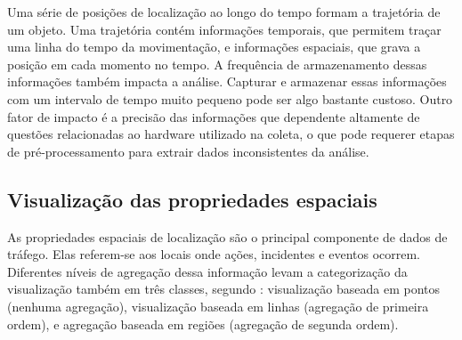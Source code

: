   Uma série de posições de localização ao longo do tempo formam a trajetória de
um objeto. Uma trajetória contém informações temporais, que permitem traçar uma
linha do tempo da movimentação, e informações espaciais, que grava a posição em
cada momento no tempo.    A frequência de armazenamento dessas informações também impacta a análise.
Capturar e armazenar essas informações com um intervalo de tempo muito pequeno
pode ser algo bastante custoso. Outro fator de impacto é a precisão das
informações que dependente altamente de questões relacionadas ao hardware
utilizado na coleta, o que pode requerer etapas de pré-processamento para
extrair dados inconsistentes da análise.

\subsection{Visualização das propriedades espaciais}

  As propriedades espaciais de localização são o principal componente de dados
de tráfego. Elas referem-se aos locais onde ações, incidentes e eventos
ocorrem. Diferentes níveis de agregação dessa informação levam a categorização
da visualização também em três classes, segundo \citet{Chen2015}: visualização
baseada em pontos (nenhuma agregação), visualização baseada em linhas
(agregação de primeira ordem), e agregação baseada em regiões (agregação de
segunda ordem).

